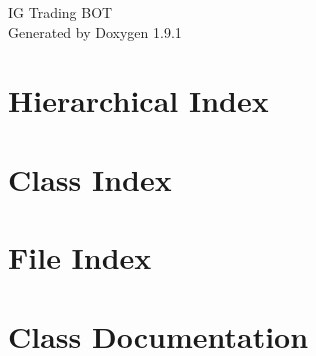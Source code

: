 \let\mypdfximage\pdfximage\def\pdfximage{\immediate\mypdfximage}\documentclass[twoside]{book}
\newcommand{\+}{\discretionary{\mbox{\scriptsize$\hookleftarrow$}}{}{}}
\newcommand{\clearemptydoublepage}{%
  \newpage{\pagestyle{empty}\cleardoublepage}%
}
\begin{document}
\raggedbottom

\hypersetup{pageanchor=false,
             bookmarksnumbered=true,
             pdfencoding=unicode
            }
\begin{titlepage}
\vspace*{7cm}
\begin{center}%
{\Large IG Trading BOT }\\
\vspace*{1cm}
{\large Generated by Doxygen 1.9.1}\\
\end{center}
\end{titlepage}
\clearemptydoublepage
{}
\tableofcontents
\clearemptydoublepage
{}
\hypersetup{pageanchor=true}

\chapter{Hierarchical Index}

\chapter{Class Index}

\chapter{File Index}

\chapter{Class Documentation}



























\end{document}
